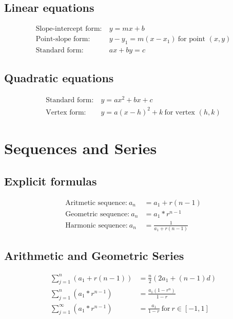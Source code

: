 \subsection{Linear equations}

\[\begin{aligned}
	\text{Slope-intercept form:}&~y = mx + b \\
	\text{Point-slope form:}&~y - y_1 = m(x - x_1)~\text{for point $(x, y)$} \\
	\text{Standard form:}&~ax + by = c
\end{aligned}\]


\subsection{Quadratic equations}

\[\begin{aligned}
	\text{Standard form:}&~y = ax^2 + bx + c \\
	\text{Vertex form:}&~y = a(x-h)^2 + k~\text{for vertex $(h, k)$}
\end{aligned}\]

\columnbreak

\section{Sequences and Series}

\subsection{Explicit formulas}
\[\begin{aligned}
	\text{Aritmetic sequence:}~a_n &= a_1 + r(n - 1) \\
	\text{Geometric sequence:}~a_n &= a_1 * r^{n - 1} \\
	\text{Harmonic sequence:}~a_n &= \frac{1}{a_1 + r(n - 1)}
\end{aligned}\]

\subsection{Arithmetic and Geometric Series}

\[\begin{aligned}
	\sum_{j=1}^{n} (a_1 + r(n-1)) &= \frac{n}{2}(2a_1 + (n - 1) d) \\
	\sum_{j=1}^{n} (a_1 * r^{n - 1}) &= \frac{a_1 (1-r^n)}{1-r} \\
	\sum_{j=1}^{\infty} (a_1 * r^{n - 1}) &= \frac{a_1}{1-r} ~\text{for}~ r \in [-1, 1] \\
\end{aligned}\]


